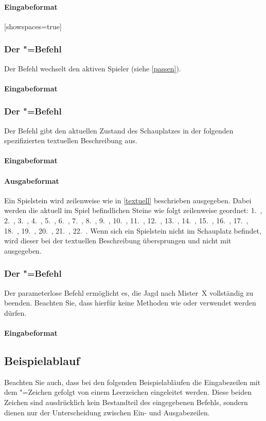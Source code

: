\documentclass[ngerman, gray]{sdqassignment}
\begin{document}
\paragraph{Eingabeformat}[showspaces=true]

\subsubsection{Der "=Befehl}
Der Befehl wechselt den aktiven Spieler (siehe \cref{passen}).
\paragraph{Eingabeformat}

\subsubsection{Der "=Befehl}
Der Befehl gibt den aktuellen Zustand des Schauplatzes in der folgenden spezifizierten textuellen Beschreibung aus.
\paragraph{Eingabeformat}
\paragraph{Ausgabeformat} Ein Spielstein wird zeilenweise wie in \cref{textuell} beschrieben ausgegeben. Dabei werden die aktuell im Spiel befindlichen Steine wie folgt zeilenweise geordnet: 1.~, 2.~, 3.~, 4.~, 5.~, 6.~, 7.~, 8.~, 9.~, 10.~, 11.~, 12.~, 13.~, 14.~, 15.~, 16.~, 17.~, 18.~, 19.~, 20.~, 21.~, 22.~. Wenn sich ein Spielstein nicht im Schauplatz befindet, wird dieser bei der textuellen Beschreibung übersprungen und nicht mit ausgegeben.

\subsubsection{Der "=Befehl}
Der parameterlose Befehl ermöglicht es, die Jagd nach Mister~X vollständig zu beenden. Beachten Sie, dass hierfür keine Methoden wie  oder  verwendet werden dürfen.
\paragraph{Eingabeformat}

\subsection{Beispielablauf}
Beachten Sie auch, dass bei den folgenden Beispielabläufen die Eingabezeilen mit dem \txt{>}"=Zeichen gefolgt von einem Leerzeichen eingeleitet werden. Diese beiden Zeichen sind ausdrücklich kein Bestandteil des eingegebenen Befehls, sondern dienen nur der Unterscheidung zwischen Ein- und Ausgabezeilen.
\end{document}
